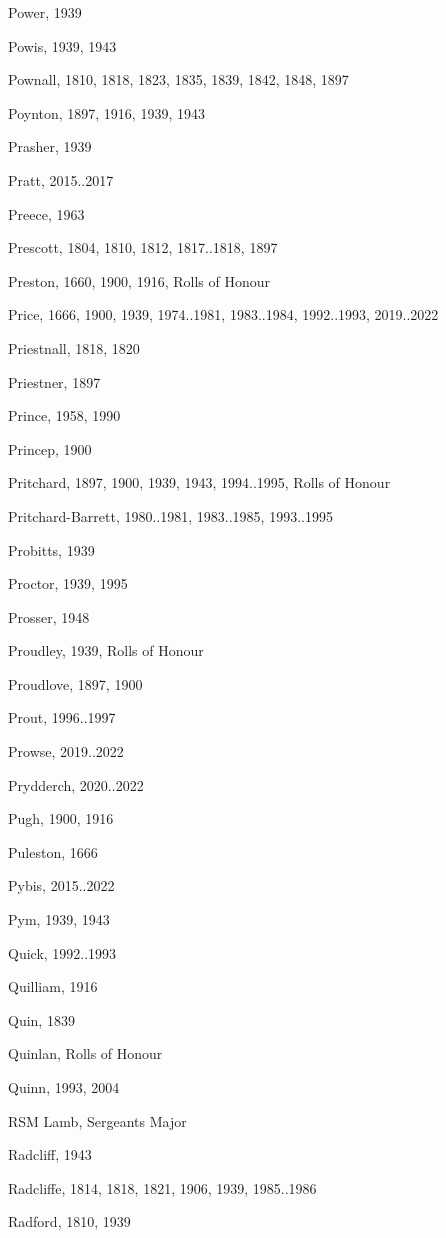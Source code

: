 {\begin{theindex}
\item Power, 1939
\item Powis, 1939, 1943
\item Pownall, 1810, 1818, 1823, 1835, 1839, 1842, 1848, 1897
\item Poynton, 1897, 1916, 1939, 1943
\item Prasher, 1939
\item Pratt, 2015..2017
\item Preece, 1963
\item Prescott, 1804, 1810, 1812, 1817..1818, 1897
\item Preston, 1660, 1900, 1916, Rolls of Honour
\item Price, 1666, 1900, 1939, 1974..1981, 1983..1984, 1992..1993, 2019..2022
\item Priestnall, 1818, 1820
\item Priestner, 1897
\item Prince, 1958, 1990
\item Princep, 1900
\item Pritchard, 1897, 1900, 1939, 1943, 1994..1995, Rolls of Honour
\item Pritchard-Barrett, 1980..1981, 1983..1985, 1993..1995
\item Probitts, 1939
\item Proctor, 1939, 1995
\item Prosser, 1948
\item Proudley, 1939, Rolls of Honour
\item Proudlove, 1897, 1900
\item Prout, 1996..1997
\item Prowse, 2019..2022
\item Prydderch, 2020..2022
\item Pugh, 1900, 1916
\item Puleston, 1666
\item Pybis, 2015..2022
\item Pym, 1939, 1943
\item Quick, 1992..1993
\item Quilliam, 1916
\item Quin, 1839
\item Quinlan, Rolls of Honour
\item Quinn, 1993, 2004
\item RSM Lamb, Sergeants Major
\item Radcliff, 1943
\item Radcliffe, 1814, 1818, 1821, 1906, 1939, 1985..1986
\item Radford, 1810, 1939

\end{theindex}}
